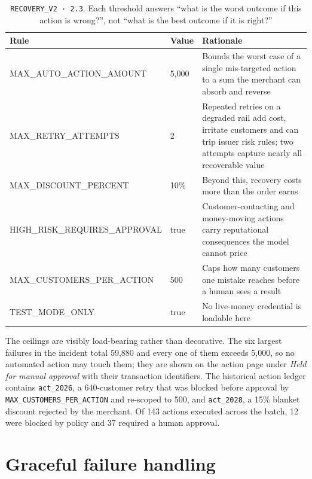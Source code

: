 \documentclass[10pt,twocolumn,a4paper]{article}
\newcommand{\rs}{\rupee}%
\newcommand{\rs}{\textrm{INR}\,}%
\newcommand{\code}[1]{\texttt{\small #1}}
\begin{document}
\begin{table}[h]
\centering
\small
\begin{tabular}{@{}>{\scriptsize\ttfamily}l l p{}@{}}
\toprule
\textrm{\textbf{Rule}} & \textbf{Value} & \textbf{Rationale} \\
\midrule
MAX\_AUTO\_ACTION\_AMOUNT & \rs{}5{,}000 & Bounds the worst case of a single mis-targeted action to a sum the merchant can absorb and reverse \\
MAX\_RETRY\_ATTEMPTS & 2 & Repeated retries on a degraded rail add cost, irritate customers and can trip issuer risk rules; two attempts capture nearly all recoverable value \\
MAX\_DISCOUNT\_PERCENT & 10\% & Beyond this, recovery costs more than the order earns \\
HIGH\_RISK\_REQUIRES\_APPROVAL & true & Customer-contacting and money-moving actions carry reputational consequences the model cannot price \\
MAX\_CUSTOMERS\_PER\_ACTION & 500 & Caps how many customers one mistake reaches before a human sees a result \\
TEST\_MODE\_ONLY & true & No live-money credential is loadable here \\
\bottomrule
\end{tabular}
\caption{\code{RECOVERY\_V2 · 2.3}. Each threshold answers ``what is the worst
outcome if this action is wrong?'', not ``what is the best outcome if it is
right?''}
\label{tab:policy}
\end{table}

The ceilings are visibly load-bearing rather than decorative. The six largest
failures in the incident total \rs{}59{,}880 and every one of them exceeds
\rs{}5{,}000, so no automated action may touch them; they are shown on the action
page under \emph{Held for manual approval} with their transaction identifiers. The
historical action ledger contains \code{act\_2026}, a 640-customer retry that was
blocked before approval by \code{MAX\_CUSTOMERS\_PER\_ACTION} and re-scoped to
500, and \code{act\_2028}, a 15\% blanket discount rejected by the merchant. Of
143 actions executed across the batch, 12 were blocked by policy and 37 required
a human approval.

\section{Graceful failure handling}
\label{sec:failure}
\end{document}
